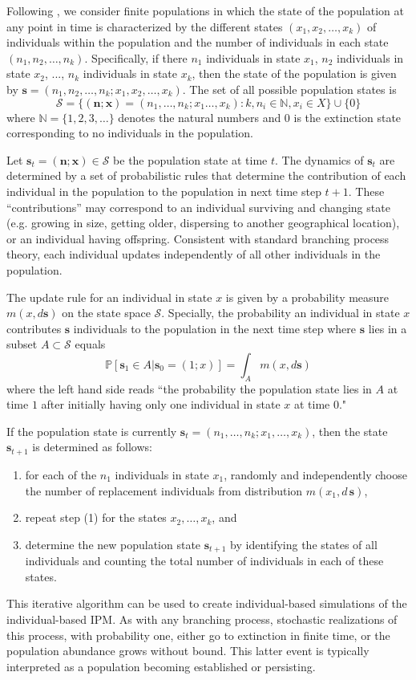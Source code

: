 \documentclass[12pt]{amsart}\usepackage[]{graphicx}\usepackage[]{color}
\def\N{\mathbb N}
\def\P{\mathbb P}
\def\N{\mathbb N}
\def\S{\mathcal S}
\def\n{\mathbf n}
\def\x{\mathbf x}
\def\s{\mathbf s}
\begin{document}
Following \citet{harris-63},  we consider finite populations in which the state of the population at any point in time is characterized by the different states $(x_1, x_2, \dots, x_k)$  of individuals within the population and the number of individuals in each state $(n_1, n_2, \dots, n_k)$. Specifically, if there $n_1$ individuals in state $x_1$, $n_2$ individuals in state $x_2$, ..., $n_k$ individuals in state $x_k$, then the state of the population is given by $\s=(n_1, n_2, \dots, n_k; x_1, x_2, \dots, x_k)$. The set of all possible population states is
\[
\S= \{(\n;\x)=(n_1, \dots, n_k; x_1\dots , x_k): k, n_i\in \N, x_i \in X\} \cup \{0\}
\]
where $\N=\{1, 2, 3, \dots\}$ denotes the natural numbers and $0$ is the extinction state corresponding to no individuals in the population.

Let  $\s_t=( \n; \x)\in \S$ be the population state at time $t$. The dynamics of $\s_t$ are determined by a set of probabilistic rules that determine the contribution of each individual in the population to the population in next time step $t+1$. These ``contributions'' may correspond to an individual surviving and changing state (e.g. growing in size, getting older, dispersing to another geographical location), or an individual having offspring.  Consistent with standard branching process theory, each individual updates independently of all other individuals  in the population.

The update rule for an individual in state $x$ is given by a probability measure $m(x, d\s)$ on the state space $\S$. Specially, the probability an individual in state $x$ contributes $\s$ individuals to the population in the next time step where $\s$ lies in a subset $A\subset \S$ equals
\[
\P[\s_1\in A| \s_0 =(1;x)]=\int_A m(x, d\s)
\]
where the left hand side reads ``the probability the population state lies in $A$ at time $1$ after initially having only one individual in state $x$ at time $0$."

If the population state is currently $\s_t=(n_1, \dots, n_k;x_1, \dots, x_k)$, then the state $\s_{t+1}$ is determined as follows:
\begin{enumerate}
\item for each of the $n_1$ individuals in state $x_1$, randomly and independently choose the number of replacement individuals from distribution $m(x_1, d\, \s)$,
\item repeat step (1) for the states $x_2, \dots, x_k$, and
\item determine the new population state $\s_{t+1}$ by identifying the states of all individuals and counting the total number of individuals in each of these states.
\end{enumerate}
This iterative algorithm can be used to create individual-based simulations of the individual-based IPM. As with any branching process, stochastic realizations of this process, with probability one, either go to extinction in finite time, or the population abundance grows without bound. This latter event is typically interpreted as a population becoming established or persisting.
\end{document}

